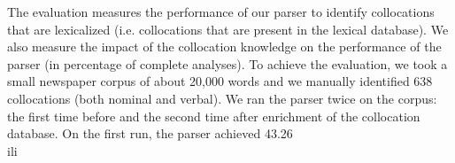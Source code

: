 \documentclass[output=paper]{langsci/langscibook}
\begin{document}
{{{The\ili{} evaluation\ili{} measures\ili{} the\ili{} performance\ili{} of\ili{} our\ili{} parser\ili{} to\ili{} identify\ili{} collocations\ili{} that\ili{} are\ili{} lexicalized\ili{} \ili{}(i\ili{}.e\ili{}.\ili{} collocations\ili{} that\ili{} are\ili{} present\ili{} in\ili{} the\ili{} lexical\ili{} database\ili{})\ili{}.\ili{} We\ili{} also\ili{} measure\ili{} the\ili{} impact\ili{} of\ili{} the\ili{} collocation\ili{} knowledge\ili{} on\ili{} the\ili{} performance\ili{} of\ili{} the\ili{} parser\ili{} \ili{}(in\ili{} percentage\ili{} of\ili{} complete\ili{} analyses\ili{})\ili{}.\ili{} To\ili{} achieve\ili{} the\ili{} evaluation\ili{},\ili{} we\ili{} took\ili{} a\ili{} small\ili{} newspaper\ili{} corpus\ili{} of\ili{} about\ili{} 20\ili{},000\ili{} words\ili{} \ili{} and\ili{} we\ili{} manually\ili{} identified\ili{} 638\ili{} collocations\ili{} \ili{}(both\ili{} nominal\ili{} and\ili{} verbal\ili{})\ili{}.\ili{} We\ili{} ran\ili{} the\ili{} parser\ili{} twice\ili{} on\ili{} the\ili{} corpus\ili{}:\ili{} the\ili{} first\ili{} time\ili{} before\ili{} and\ili{} the\ili{} second\ili{} time\ili{} after\ili{} enrichment\ili{} of\ili{} the\ili{} collocation\ili{} database\ili{}.\ili{} \ili{}
On\ili{} the\ili{} first\ili{} run\ili{},\ili{} the\ili{} parser\ili{} achieved\ili{} 43\ili{}.26\ili{}\\ili{}%
}}}
\end{document}
